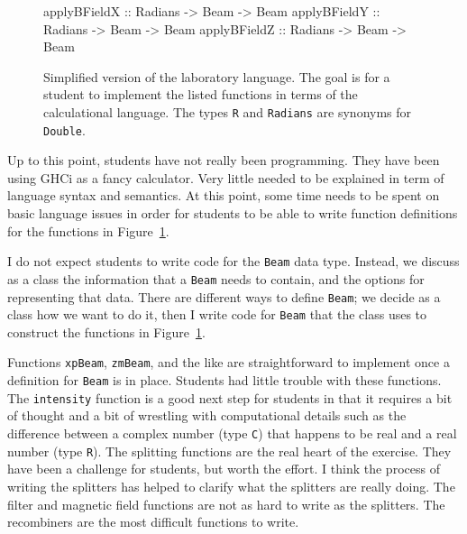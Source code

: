 \documentclass[12pt]{article}
\newcommand{\DataTypeTok}[1]{\textcolor[rgb]{0.56,0.13,0.00}{{#1}}}
\newcommand{\SpecialCharTok}[1]{\textcolor[rgb]{0.25,0.44,0.63}{{#1}}}
\newcommand{\FunctionTok}[1]{\textcolor[rgb]{0.02,0.16,0.49}{{#1}}}
\begin{document}
\begin{figure}
\begin{Highlighting}[]
\FunctionTok{applyBFieldX} \SpecialCharTok{::} \DataTypeTok{Radians} \SpecialCharTok{->} \DataTypeTok{Beam} \SpecialCharTok{->} \DataTypeTok{Beam}
\FunctionTok{applyBFieldY} \SpecialCharTok{::} \DataTypeTok{Radians} \SpecialCharTok{->} \DataTypeTok{Beam} \SpecialCharTok{->} \DataTypeTok{Beam}
\FunctionTok{applyBFieldZ} \SpecialCharTok{::} \DataTypeTok{Radians} \SpecialCharTok{->} \DataTypeTok{Beam} \SpecialCharTok{->} \DataTypeTok{Beam}
\end{Highlighting}
\caption{Simplified version of the laboratory language.
  The goal is for a student to implement
  the listed functions in terms of the calculational language.
  The types \DataTypeTok{\texttt{R}} and \DataTypeTok{\texttt{Radians}}
  are synonyms for \DataTypeTok{\texttt{Double}}.
}
\label{simplelablang}
\end{figure}

Up to this point, students have not really been programming.
They have been using GHCi as a fancy calculator.
Very little needed to be explained in term of language
syntax and semantics.
At this point, some time needs to be spent on basic language
issues in order for students to be able to write function
definitions for the functions in Figure~\ref{simplelablang}.

I do not expect students to write code for the \DataTypeTok{\texttt{Beam}}
data type.  Instead, we discuss as a class the information that a
\DataTypeTok{\texttt{Beam}} needs to contain, and the options
for representing that data.  There are different ways to define
\DataTypeTok{\texttt{Beam}}; we decide as a class how we want to do it,
then I write code for \DataTypeTok{\texttt{Beam}} that the class uses
to construct the functions in Figure~\ref{simplelablang}.

Functions \FunctionTok{\texttt{xpBeam}}, \FunctionTok{\texttt{zmBeam}},
and the like are straightforward to implement once a definition
for \DataTypeTok{\texttt{Beam}} is in place.  Students had little trouble
with these functions.  The \FunctionTok{\texttt{intensity}} function
is a good next step for students in that it requires a bit of thought
and a bit of wrestling with computational details such as the difference
between a complex number (type \DataTypeTok{\texttt{C}}) that happens
to be real and a real number (type \DataTypeTok{\texttt{R}}).
The splitting functions are the real heart of the exercise.
They have been a challenge for students, but worth the effort.
I think the process of writing the splitters has helped to clarify
what the splitters are really doing.
The filter and magnetic field functions are not as hard to write
as the splitters.  The recombiners are the most difficult functions
to write.
\end{document}
